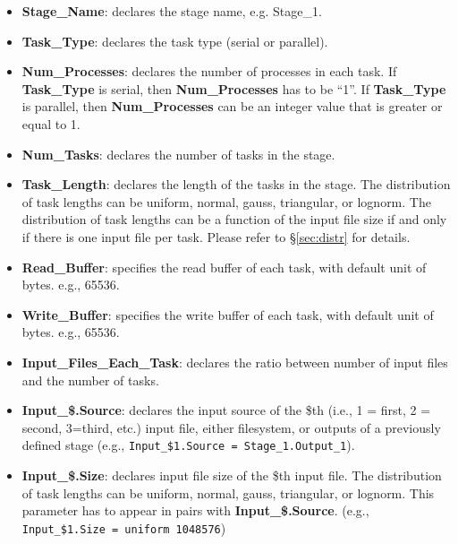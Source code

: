 \documentclass[10pt,a4paper]{article}
\begin{document}
\begin{itemize}

\item{\textbf{Stage\_Name}:} declares the stage name, e.g. Stage\_1.

\item{\textbf{Task\_Type}:} declares the task type (serial or parallel).

\item{\textbf{Num\_Processes}:} declares the number of processes in each task. If \textbf{Task\_Type} is serial, then \textbf{Num\_Processes} has to be ``1''. If \textbf{Task\_Type} is parallel, then \textbf{Num\_Processes} can be an integer value that is greater or equal to 1.

\item{\textbf{Num\_Tasks}:} declares the number of tasks in the stage.

\item{\textbf{Task\_Length}:} declares the length of the tasks in the stage. The distribution of task lengths can be uniform, normal, gauss, triangular, or lognorm. The distribution of task lengths can be a function of the input file size if and only if there is one input file per task. Please refer to \S\ref{sec:distr} for details.

\item{\textbf{Read\_Buffer}:} specifies the read buffer of each task, with default unit of bytes. e.g., 65536.

\item{\textbf{Write\_Buffer}:} specifies the write buffer of each task, with default unit of bytes. e.g., 65536.

\item{\textbf{Input\_Files\_Each\_Task}:} declares the ratio between number of input files and the number of tasks.


\item{\textbf{Input\_\$.Source}:} declares the input source of the \$th (i.e., 1 = first, 2 = second, 3=third, etc.) input file, either filesystem, or outputs of a previously defined stage (e.g., {\tt Input\_\$1.Source = Stage\_1.Output\_1}). 

\item{\textbf{Input\_\$.Size}:}  declares input file size of the  \$th input file. The distribution of task lengths can be uniform, normal, gauss, triangular, or lognorm. This parameter has to appear in pairs with \textbf{Input\_\$.Source}. (e.g., {\tt Input\_\$1.Size = uniform 1048576})


\end{itemize}
\end{document}
